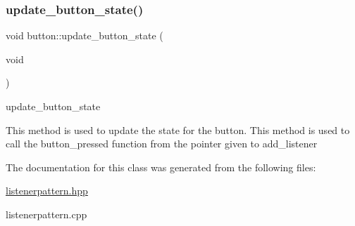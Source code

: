 \subsubsection{\texorpdfstring{update\+\_\+button\+\_\+state()}{update\_button\_state()}}
{\footnotesize\ttfamily void button\+::update\+\_\+button\+\_\+state (\begin{DoxyParamCaption}\item[{void}]{ }\end{DoxyParamCaption})}



update\+\_\+button\+\_\+state 

This method is used to update the state for the button. This method is used to call the button\+\_\+pressed function from the pointer given to add\+\_\+listener 

The documentation for this class was generated from the following files\+:\begin{DoxyCompactItemize}
\item 
\hyperlink{listenerpattern_8hpp}{listenerpattern.\+hpp}\item 
listenerpattern.\+cpp\end{DoxyCompactItemize}
